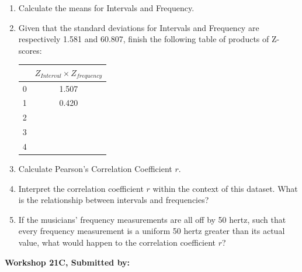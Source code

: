 \documentclass[11pt, chapterprefix=true]{scrbook}\usepackage[]{graphicx}\usepackage[]{color}
\begin{document}
\begin{exercises}
\begin{exercise}
\begin{enumerate}
  \item Calculate the means for Intervals and Frequency.
  \item	Given that the standard deviations for Intervals and Frequency are respectively 1.581 and 60.807, finish the following table of products of Z-scores:

{\small{
\begin{center}
\begin{tabular}{@{} rc @{}} \hline
	& $Z_{Interval} \times Z_{frequency}$ \\ \hline
0& 	1.507 \\
1&	0.420  \\
2	& \\
3	& \\
4	& \\ \hline
\end{tabular}
\end{center}
}}

  \item	Calculate Pearson's Correlation Coefficient $r$.
  \item Interpret the correlation coefficient $r$ within the context of this dataset.  What is the relationship between intervals and frequencies?
  \item If the musicians' frequency measurements are all off by 50 hertz, such that every frequency measurement is a uniform 50 hertz greater than its actual value, what would happen to the correlation coefficient $r$?
\end{enumerate}

\end{exercise}
\begin{solution}  %

\end{solution}


\clearpage

    \begin{exercise}  %

    \begin{center}
\begin{flushleft}\textbf{\large \hfill Workshop 21C, Submitted by: }\end{flushleft}

\end{center}
\end{exercise}
\end{exercises}
\end{document}
